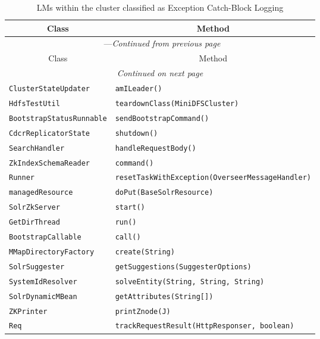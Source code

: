 \begin{center}
\begin{longtable}{ll}
\caption{LMs within the cluster classified as Exception Catch-Block Logging}\\
\toprule\multicolumn{1}{c}{Class}&\multicolumn{1}{c}{Method}\\\midrule
\endfirsthead

\multicolumn{2}{c}{\tablename\ \thetable{}---\textit{Continued from previous page}} \\\midrule
\multicolumn{1}{c}{Class}&\multicolumn{1}{c}{Method}\\\midrule
\endhead
\multicolumn{2}{c}{\textit{Continued on next page}}\\\midrule
\endfoot
\bottomrule
\endlastfoot

\lstinline/ClusterStateUpdater/&{\lstinline/amILeader()/}\\
\lstinline/HdfsTestUtil/&{\lstinline/teardownClass(MiniDFSCluster)/}\\
\lstinline/BootstrapStatusRunnable/&{\lstinline/sendBootstrapCommand()/}\\
\lstinline/CdcrReplicatorState/&{\lstinline/shutdown()/}\\
\lstinline/SearchHandler/&{\lstinline/handleRequestBody()/}\\
\lstinline/ZkIndexSchemaReader/&{\lstinline/command()/}\\
\lstinline/Runner/&{\lstinline/resetTaskWithException(OverseerMessageHandler)/}\\
\lstinline/managedResource/&{\lstinline/doPut(BaseSolrResource)/}\\
\lstinline/SolrZkServer/&{\lstinline/start()/}\\
\lstinline/GetDirThread/&{\lstinline/run()/}\\
\lstinline/BootstrapCallable/&{\lstinline/call()/}\\
\lstinline/MMapDirectoryFactory/&{\lstinline/create(String)/}\\
\lstinline/SolrSuggester/&{\lstinline/getSuggestions(SuggesterOptions)/}\\
\lstinline/SystemIdResolver/&{\lstinline/solveEntity(String, String, String)/}\\
\lstinline/SolrDynamicMBean/&{\lstinline/getAttributes(String[])/}\\
\lstinline/ZKPrinter/&{\lstinline/printZnode(J)/}\\
\lstinline/Req/&{\lstinline/trackRequestResult(HttpResponser, boolean)/}\\

\end{longtable}
\end{center}
